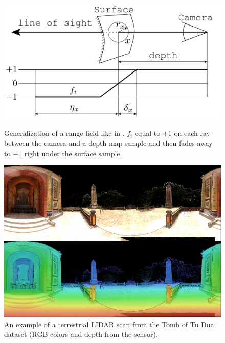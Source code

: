 \documentclass[10pt,twocolumn,letterpaper]{article}
\begin{document}
\begin{figure}
    \centering
    \begin{minipage}[b]{0.54\linewidth}
    \capstart
    \includegraphics[width=\textwidth]{images/figures/range_image_material2.png}
    \caption{Generalization of a range field like in \cite{zach2007globally}. $f_i$ equal to $+1$ on each ray between the camera and a depth map sample and then fades away to $-1$ right under the surface sample.}
    \label{fig:range_field}
    \end{minipage}
    \begin{minipage}[b]{0.5\linewidth}
    \end{minipage}
    \begin{minipage}[b]{0.40\linewidth}
    \capstart
    \includegraphics[width=\textwidth]{images/figures/lidar_360_tomboftuduc_677p.jpg}
    \caption{An example of a terrestrial LIDAR scan from the Tomb of Tu Duc dataset (RGB colors and depth from the sensor).}
    \label{fig:lidar_360_example}
    \end{minipage}
\end{figure}
\end{document}
